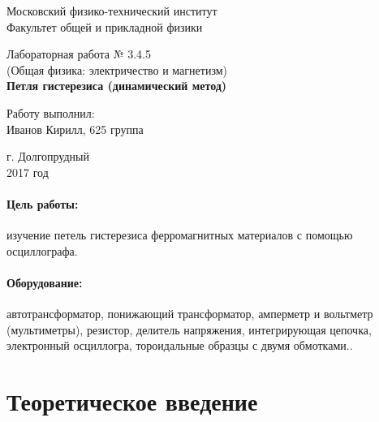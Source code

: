 \documentclass[12pt]{kiarticle} %
\begin{document}
		
		\begin{titlepage}
			\begin{center}
				\large 	Московский физико-технический институт \\
				Факультет общей и прикладной физики \\
				\vspace{0.2cm}
				
				\vspace{4.5cm}
				Лабораторная работа № 3.4.5 \\ \vspace{0.2cm}
				\large (Общая физика: электричество и магнетизм) \\ \vspace{0.2cm}
				\LARGE \textbf{Петля гистерезиса (динамический метод)}
			\end{center}
			\vspace{2.3cm} \large
			
			\begin{center}
				Работу выполнил: \\
				Иванов Кирилл,
				625 группа
				\vspace{10mm}		
				
			\end{center}
			
			\begin{center} \vspace{60mm}
				г. Долгопрудный \\
				2017 год
			\end{center}
		\end{titlepage}

	
	\paragraph*{Цель работы:} изучение петель гистерезиса ферромагнитных материалов с помощью осциллографа.
	
	\paragraph*{Оборудование:} автотрансформатор, понижающий трансформатор, амперметр и вольтметр (мультиметры), резистор, делитель напряжения, интегрирующая
	цепочка, электронный осциллогра, тороидальные образцы с двумя обмотками..
	
	\section{Теоретическое введение}
	
\end{document}

